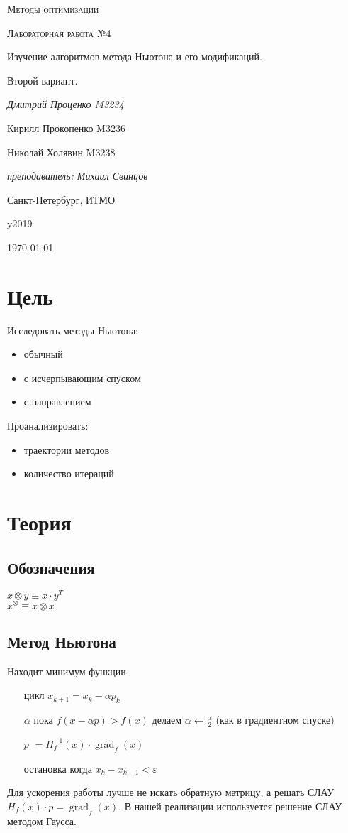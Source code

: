 \documentclass[russian, english]{article}
\begin{document}
\begin{titlepage}
\centering
	{\scshape\LARGE Методы оптимизации \par}
	\vspace{1cm}
	{\scshape\Large Лабораторная работа №4\par Изучение алгоритмов метода Ньютона и его модификаций.\par Второй вариант.\par}
	\vspace{2cm}
	{\Large\itshape Дмитрий Проценко M3234 \par
	Кирилл Прокопенко M3236 \par
	Николай Холявин M3238 \par}
	\vfill
	{\itshape преподаватель: Михаил Свинцов\par}
	\vfill
	Санкт-Петербург, ИТМО\par y2019
	\vfill
	{\large \today\par}
\end{titlepage}

\tableofcontents
\newpage

\section{Цель}
Исследовать методы Ньютона:
\begin{itemize}
	\item обычный
	\item с исчерпывающим спуском
	\item с направлением
\end{itemize}
Проанализировать:
\begin{itemize}
	\item траектории методов
	\item количество итераций
\end{itemize}

\section{Теория}
\subsection{Обозначения}
$x\otimes y\equiv x\cdot y^T$\\
$x^\otimes \equiv x\otimes x$\\
\subsection{Метод Ньютона}
Находит минимум функции
\begin{itemize}
	\item[цикл] $x_{k+1} = x_{k} - \alpha p_{k}$
	\item[$\alpha$] пока $f(x - \alpha p) > f(x)$ делаем $\alpha\leftarrow \frac{\alpha}{2}$ (как в градиентном спуске)
	\item[$p$] $= H_f^{-1}(x)\cdot\operatorname{grad}_f(x)$
	\item[остановка] когда $x_k - x_{k - 1} < \varepsilon$
\end{itemize}
Для ускорения работы лучше не искать обратную матрицу, а решать СЛАУ $H_f(x)\cdot p=\operatorname{grad}_f(x)$. В нашей реализации используется решение СЛАУ методом Гаусса.
\end{document}
